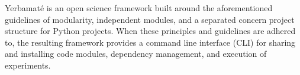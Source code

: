 


Yerbamaté is an open science framework built around the aforementioned guidelines of modularity, independent modules, and a separated concern project structure for Python projects. When these principles and guidelines are adhered to, the resulting framework provides a command line interface (CLI) for sharing and installing code modules, dependency management, and execution of experiments. 


